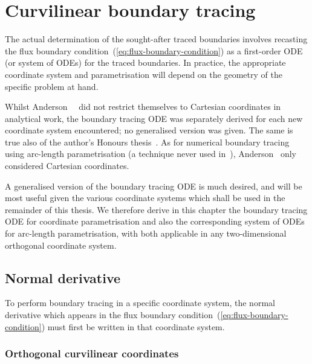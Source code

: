 \chapter{Curvilinear boundary tracing}
\label{ch:curvilinear}

The actual determination of the sought-after traced boundaries involves
recasting the flux boundary condition~(\ref{eq:flux-boundary-condition})
as a first-order ODE (or system of ODEs) for the traced boundaries.
In practice, the appropriate coordinate system and parametrisation
will depend on the geometry of the specific problem at hand.

Whilst Anderson~\etal~\cite{
  anderson-2007-boundary-tracing-i-theory,
  anderson-2007-boundary-tracing-ii-applications
}
did not restrict themselves to Cartesian coordinates in analytical work,
the boundary tracing ODE was separately derived
for each new coordinate system encountered;
no generalised version was given.
The same is true also of
the author's Honours thesis~\cite{li-2017-thesis-rounding-capillary-wedge}.
As for numerical boundary tracing using arc-length parametrisation
(a technique never used in~\cite{li-2017-thesis-rounding-capillary-wedge}),
Anderson~\cite{anderson-2002-thesis-boundary-tracing-pdes}
only considered Cartesian coordinates.

A generalised version of the boundary tracing ODE is much desired,
and will be most useful given the various coordinate systems
which shall be used in the remainder of this thesis.
We therefore derive in this chapter
the boundary tracing ODE for coordinate parametrisation
and also the corresponding system of ODEs for arc-length parametrisation,
with both applicable in any two-dimensional orthogonal coordinate system.

\section{Normal derivative}
\label{sec:curvilinear.derivative}

To perform boundary tracing in a specific coordinate system,
the normal derivative which appears
in the flux boundary condition~(\ref{eq:flux-boundary-condition})
must first be written in that coordinate system.

\subsection{Orthogonal curvilinear coordinates}
\label{sec:curvilinear.derivative.orthogonal}

